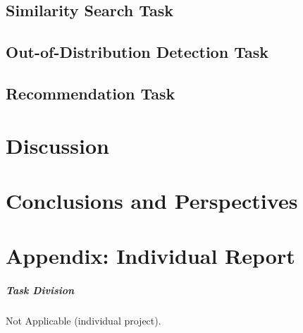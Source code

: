\documentclass[12pt, a4paper]{report}
\begin{document}
\section{Similarity Search Task}



\section{Out-of-Distribution Detection Task}



\section{Recommendation Task}



\chapter{Discussion}



\chapter{Conclusions and Perspectives}






\appendix
\chapter*{Appendix: Individual Report}

\paragraph{Task Division} Not Applicable (individual project).
\end{document}
